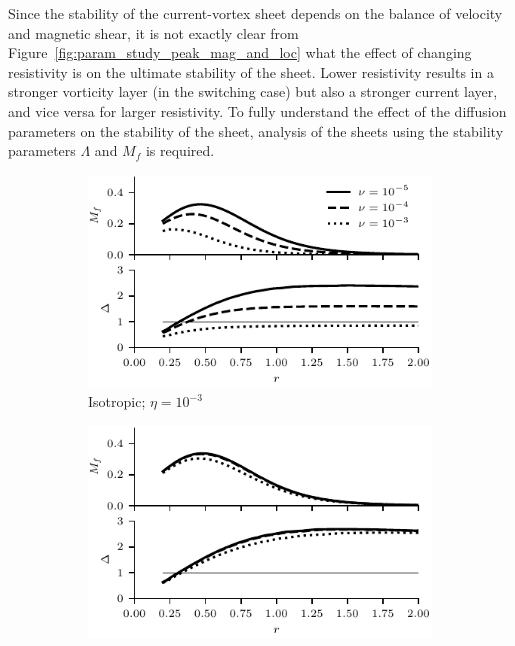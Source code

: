 Since the stability of the current-vortex sheet depends on the balance of velocity and magnetic shear, it is not exactly clear from Figure~\ref{fig:param_study_peak_mag_and_loc} what the effect of changing resistivity is on the ultimate stability of the sheet. Lower resistivity results in a stronger vorticity layer (in the switching case) but also a stronger current layer, and vice versa for larger resistivity. To fully understand the effect of the diffusion parameters on the stability of the sheet, analysis of the sheets using the stability parameters $\Lambda$ and $M_f$ is required.

\begin{figure}[h]
    \hfill
    \begin{subfigure}{0.49\textwidth}
      \centering
  \includegraphics[width=1.0\linewidth]{param_study/mach_numbers_eta_3_iso.pdf}
      \caption{Isotropic; $\eta = 10^{-3}$}%
      \label{fig:mach_numbers_eta_3_iso}
    \end{subfigure}
    \hfill
    \begin{subfigure}{0.49\textwidth}
      \centering
  \includegraphics[width=1.0\linewidth]{param_study/mach_numbers_eta_3_swi.pdf}

\end{subfigure}
\end{figure}
